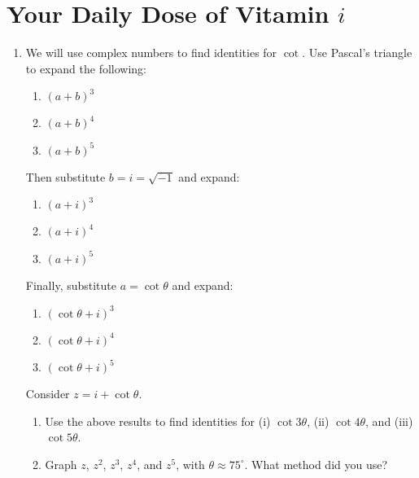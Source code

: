 \documentclass[../gatm.tex]{subfiles}
\begin{document}
\section{Your Daily Dose of Vitamin $i$}

\newcommand{\Arg} {\operatorname{Arg}}
\newcommand{\cis} {\operatorname{cis}}
\newcommand{\Real} {\operatorname{Re}}
\newcommand{\Imag} {\operatorname{Im}}


\begin{enumerate}
\item We will use complex numbers to find identities for $\cot$. Use Pascal's triangle to expand the following:
\begin{multicols}{3}
\begin{enumerate}
\item $(a+b)^3$
\item $(a+b)^4$
\item $(a+b)^5$
\setcounter{vit_i_problem_ii}{\value{enumii}}
\end{enumerate}
\end{multicols}
Then substitute $b=i=\sqrt{-1}$ and expand:
\begin{multicols}{3}
\begin{enumerate}
\setcounter{enumii}{\value{vit_i_problem_ii}}
\item $(a+i)^3$
\item $(a+i)^4$
\item $(a+i)^5$
\setcounter{vit_i_problem_ii}{\value{enumii}}
\end{enumerate}
\end{multicols}
Finally, substitute $a=\cot \theta$ and expand:
\begin{multicols}{3}
\begin{enumerate}
\setcounter{enumii}{\value{vit_i_problem_ii}}
\item $(\cot \theta +i)^3$
\item $(\cot \theta +i)^4$
\item $(\cot \theta +i)^5$
\setcounter{vit_i_problem_ii}{\value{enumii}}
\end{enumerate}
\end{multicols}
Consider $z=i+\cot\theta$.
\begin{enumerate}
\setcounter{enumii}{\value{vit_i_problem_ii}}
\item Use the above results to find identities for (i) $\cot 3\theta$, (ii) $\cot 4\theta$, and (iii) $\cot 5\theta$.
\item Graph $z$, $z^2$, $z^3$, $z^4$, and $z^5$, with $\theta \approx 75^\circ$. What method did you use?
\end{enumerate}


\end{enumerate}
\end{document}
